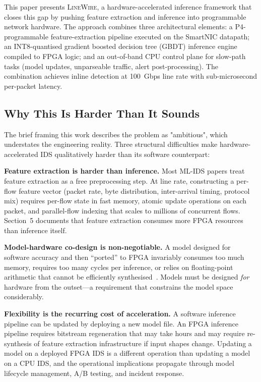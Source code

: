 \documentclass[sigconf,nonacm]{acmart}
\begin{document}
This paper presents \textsc{LineWire}, a hardware-accelerated inference
framework that closes this gap by pushing feature extraction and
inference into programmable network hardware. The approach combines
three architectural elements: a P4-programmable feature-extraction
pipeline executed on the SmartNIC datapath; an INT8-quantised gradient
boosted decision tree (GBDT) inference engine compiled to FPGA logic;
and an out-of-band CPU control plane for slow-path tasks (model updates,
unparseable traffic, alert post-processing). The combination achieves
inline detection at 100~Gbps line rate with sub-microsecond
per-packet latency.

\subsection{Why This Is Harder Than It Sounds}

The brief framing this work describes the problem as "ambitious", which
understates the engineering reality. Three structural difficulties make
hardware-accelerated IDS qualitatively harder than its software
counterpart:

\textbf{Feature extraction is harder than inference.} Most ML-IDS papers
treat feature extraction as a free preprocessing step. At line rate,
constructing a per-flow feature vector (packet rate, byte distribution,
inter-arrival timing, protocol mix) requires per-flow state in fast
memory, atomic update operations on each packet, and parallel-flow
indexing that scales to millions of concurrent flows. Section~5 documents
that feature extraction consumes more FPGA resources than inference itself.

\textbf{Model-hardware co-design is non-negotiable.} A model designed for
software accuracy and then ``ported'' to FPGA invariably consumes too much
memory, requires too many cycles per inference, or relies on
floating-point arithmetic that cannot be efficiently
synthesised~\cite{umuroglu2023finn,nakahara2024hwml}. Models must be
designed \emph{for} hardware from the outset---a requirement that
constrains the model space considerably.

\textbf{Flexibility is the recurring cost of acceleration.} A software
inference pipeline can be updated by deploying a new model file. An
FPGA inference pipeline requires bitstream regeneration that may take
hours and may require re-synthesis of feature extraction infrastructure
if input shapes change. Updating a model on a deployed FPGA IDS is a
different operation than updating a model on a CPU IDS, and the
operational implications propagate through model lifecycle management,
A/B testing, and incident response.
\end{document}
